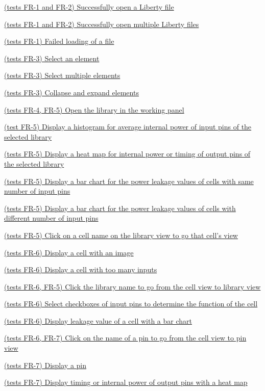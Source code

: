 \documentclass[10pt,a4paper]{report}
\newcommand{\refer}[2]{\hyperref[#1]{\textcolor{col:reference}{#2}}}
\begin{document}
\begin{GTC}
    \item \refer{GTC-1}{(tests FR-1 and FR-2) Successfully open a Liberty file}
    \item \refer{GTC-2} {(tests FR-1 and FR-2) Successfully open multiple Liberty files}
    \item \refer{GTC-3} {(tests FR-1) Failed loading of a file}
    \item \refer{GTC-4} {(tests FR-3) Select an element}
    \item \refer{GTC-5} {(tests FR-3) Select multiple elements}
    \item \refer{GTC-6} {(tests FR-3) Collapse and expand elements}
    \item \refer{GTC-7} {(tests FR-4, FR-5) Open the library in the working panel}
    \item \refer{GTC-8} {(test FR-5) Display a histogram for average internal power of input pins of the selected library}
    \item \refer{GTC-9} {(tests FR-5) Display a heat map for internal power or timing of output pins of the selected library}
    \item \refer{GTC-10} {(tests FR-5) Display a bar chart for the power leakage values of cells with same number of input pins}
    \item \refer{GTC-11} {(tests FR-5) Display a bar chart for the power leakage values of cells with different number of input pins}
    \item \refer{GTC-12} {(tests FR-5) Click on a cell name on the library view to go that cell's view}
    \item \refer{GTC-13} {(tests FR-6) Display a cell with an image}
    \item \refer{GTC-14} {(tests FR-6) Display a cell with too many inputs}
    \item \refer{GTC-15} {(tests FR-6, FR-5) Click the library name to go from the cell view to library view}
    \item \refer{GTC-16} {(tests FR-6) Select checkboxes of input pins to determine the function of the cell}
    \item \refer{GTC-17} {(tests FR-6) Display leakage value of a cell with a bar chart}
    \item \refer{GTC-18} {(tests FR-6, FR-7) Click on the name of a pin to go from the cell view to pin view}
    \item \refer{GTC-19} {(tests FR-7) Display a pin}
    \item \refer{GTC-20} {(tests FR-7) Display timing or internal power of output pins with a heat map}

\end{GTC}
\end{document}
